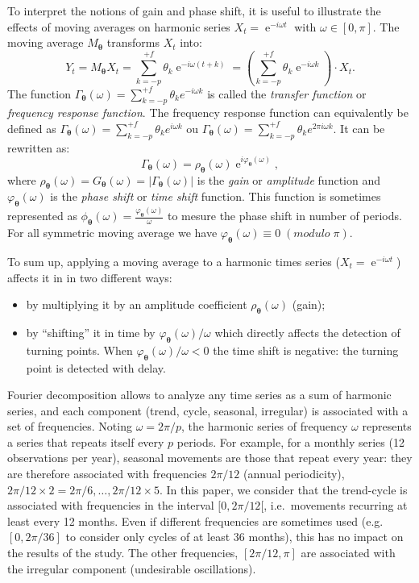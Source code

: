 \documentclass[
]{article}
\DeclareMathOperator{\e}{e}
\newcommand\1{\mathds{1}}
\begin{document}
To interpret the notions of gain and phase shift, it is useful to
illustrate the effects of moving averages on harmonic series
\(X_t=\e^{-i\omega t}\) with \(\omega\in[0,\pi]\). The moving average
\(M_{\boldsymbol\theta}\) transforms \(X_t\) into: \[
Y_t = M_{\boldsymbol\theta}X_t = \sum_{k=-p}^{+f} \theta_k \e^{-i \omega (t+k)}
= \left(\sum_{k=-p}^{+f} \theta_k \e^{-i \omega k}\right)\cdot X_t.
\] The function
\(\Gamma_{\boldsymbol\theta}(\omega)=\sum_{k=-p}^{+f} \theta_k e^{-i \omega k}\)
is called the \emph{transfer function} or \emph{frequency response
function}. The frequency response function can equivalently be defined
as
\(\Gamma_{\boldsymbol\theta}(\omega)=\sum_{k=-p}^{+f} \theta_k e^{i \omega k}\)
ou
\(\Gamma_{\boldsymbol\theta}(\omega)=\sum_{k=-p}^{+f} \theta_k e^{2\pi i \omega k}\).
It can be rewritten as: \[
\Gamma_{\boldsymbol\theta}(\omega) = \rho_{\boldsymbol\theta}(\omega)\e^{i\varphi_{\boldsymbol\theta}(\omega)},
\] where
\(\rho_{\boldsymbol\theta}(\omega)=G_{\boldsymbol\theta}(\omega)=\lvert\Gamma_{\boldsymbol\theta}(\omega)\rvert\)
is the \emph{gain} or \emph{amplitude} function and
\(\varphi_{\boldsymbol\theta}(\omega)\) is the \emph{phase shift} or
\emph{time shift} function. This function is sometimes represented as
\(\phi_{\boldsymbol\theta}(\omega)=\frac{\varphi_{\boldsymbol\theta}(\omega)}{\omega}\)
to mesure the phase shift in number of periods. For all symmetric moving
average we have
\(\varphi_{\boldsymbol\theta}(\omega)\equiv 0 \;(modulo\;{\pi})\).

To sum up, applying a moving average to a harmonic times series
(\(X_t=\e^{-i\omega t}\)) affects it in in two different ways:

\begin{itemize}
\item
  by multiplying it by an amplitude coefficient
  \(\rho_{\boldsymbol\theta}\left(\omega\right)\) (gain);
\item
  by ``shifting'' it in time by
  \(\varphi_{\boldsymbol\theta}(\omega)/\omega\) which directly affects
  the detection of turning points. When
  \(\varphi_{\boldsymbol\theta}(\omega)/\omega<0\) the time shift is
  negative: the turning point is detected with delay.
\end{itemize}

Fourier decomposition allows to analyze any time series as a sum of
harmonic series, and each component (trend, cycle, seasonal, irregular)
is associated with a set of frequencies. Noting \(\omega = 2\pi/p\), the
harmonic series of frequency \(\omega\) represents a series that repeats
itself every \(p\) periods. For example, for a monthly series (12
observations per year), seasonal movements are those that repeat every
year: they are therefore associated with frequencies \(2\pi/12\) (annual
periodicity), \(2\pi/12\times 2=2\pi/6,\dots,2\pi/12\times 5\). In this
paper, we consider that the trend-cycle is associated with frequencies
in the interval \([0, 2\pi/12[\), i.e.~movements recurring at least
every 12 months. Even if different frequencies are sometimes used
(e.g.~\([0, 2\pi/36]\) to consider only cycles of at least 36 months),
this has no impact on the results of the study. The other frequencies,
\([2\pi/12, \pi]\) are associated with the irregular component
(undesirable oscillations).
\end{document}
